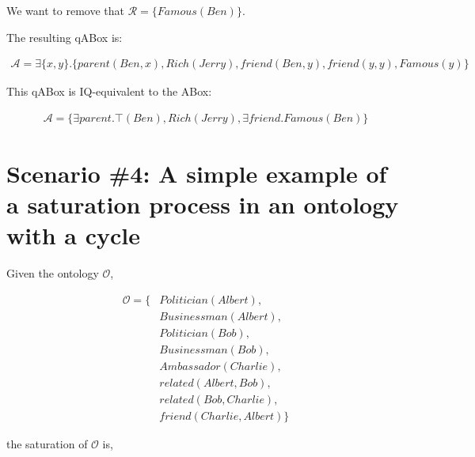 We want to remove that $\mathcal{R} = \{ Famous(Ben) \}$.

The resulting qABox is:

\begin{equation*}
    \begin{aligned}
        \mathcal{A} = \exists \{ x, y \}.\{ parent(Ben, x), Rich(Jerry), friend(Ben, y), friend(y, y), Famous(y) \}
    \end{aligned}
\end{equation*}

This qABox is IQ-equivalent to the ABox:

\begin{equation*}
    \begin{aligned}
        \mathcal{A} = \{ \exists parent.\top(Ben), Rich(Jerry), \exists friend.Famous(Ben) \}
    \end{aligned}
\end{equation*}

\section{Scenario \#4: A simple example of a saturation process in an ontology with a cycle}
\label{sec:scenario-4}

Given the ontology $\mathcal{O}$,

\begin{equation*}
    \begin{aligned}
        \mathcal{O} = \{ & Politician(Albert),     \\
                         & Businessman(Albert),    \\
                         & Politician(Bob),        \\
                         & Businessman(Bob),       \\
                         & Ambassador(Charlie),    \\
                         & related(Albert, Bob),   \\
                         & related(Bob, Charlie),  \\ 
                         & friend(Charlie, Albert) \}
    \end{aligned}
\end{equation*}

the saturation of $\mathcal{O}$ is,

